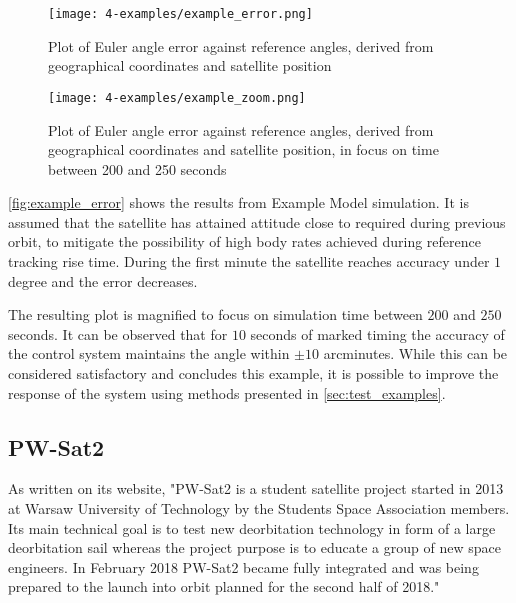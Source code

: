             \begin{figure}[H]
                \centering
                \texttt{[image: 4-examples/example\_error.png]}
                \caption{Plot of Euler angle error against reference angles, derived from geographical coordinates and satellite position}
                \label{fig:example_error}
            \end{figure}
                         
            \begin{figure}[H]
                \centering
                \texttt{[image: 4-examples/example\_zoom.png]}
                \caption{Plot of Euler angle error against reference angles, derived from geographical coordinates and satellite position, in focus on time between 200 and 250 seconds}
                \label{fig:example_zoom}
            \end{figure}

            \autoref{fig:example_error} shows the results from Example Model simulation. It is assumed that the satellite has attained attitude close to required during previous orbit, to mitigate the possibility of high body rates achieved during reference tracking rise time. During the first minute the satellite reaches accuracy under $1$ degree and the error decreases.

            The resulting plot is magnified to focus on simulation time between $200$ and $250$ seconds. It can be observed that for $10$ seconds of marked timing the accuracy of the control system maintains the angle within $\pm 10$ arcminutes. While this can be considered satisfactory and concludes this example, it is possible to improve the response of the system using methods presented in \autoref{sec:test_examples}.
 





    \subsection{PW-Sat2}\label{sec:pwsat2}
        As written on its website, "PW-Sat2 is a student satellite project started in 2013 at Warsaw University of Technology by the Students Space Association members. Its main technical goal is to test new deorbitation technology in form of a large deorbitation sail whereas the project purpose is to educate a group of new space engineers. In February 2018 PW-Sat2 became fully integrated and was being prepared to the launch into orbit planned for the second half of 2018."\cite{pwsat2website}
                         
